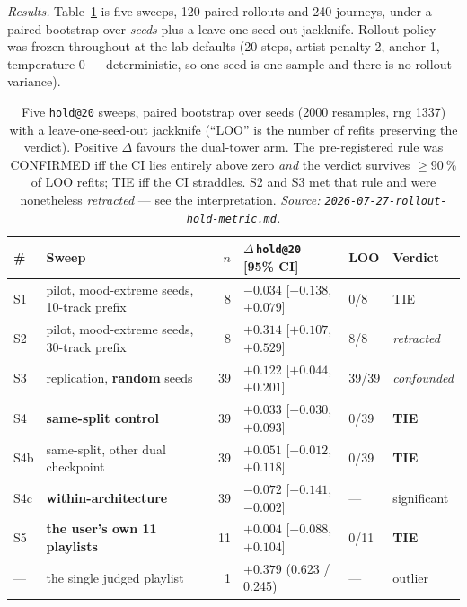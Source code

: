 \documentclass[11pt]{article}
\newcommand{\best}[1]{\textbf{#1}}
\begin{document}
\emph{Results.} Table~\ref{tab:rollout} is five sweeps, \num{120} paired
rollouts and \num{240} journeys, under a paired bootstrap over \emph{seeds} plus a
leave-one-seed-out jackknife. Rollout policy was frozen throughout at the lab
defaults (\num{20} steps, artist penalty \num{2}, anchor \num{1}, temperature
\num{0} --- deterministic, so one seed is one sample and there is no rollout
variance).

\begin{table}[ht]
  \centering
  \caption{Five \texttt{hold@20} sweeps, paired bootstrap over seeds (\num{2000}
  resamples, rng \num{1337}) with a leave-one-seed-out jackknife (``LOO'' is the
  number of refits preserving the verdict). Positive $\Delta$ favours the
  dual-tower arm. The pre-registered rule was CONFIRMED iff the CI lies entirely
  above zero \emph{and} the verdict survives $\ge\SI{90}{\percent}$ of LOO refits;
  TIE iff the CI straddles. S2 and S3 met that rule and were nonetheless
  \emph{retracted} --- see the interpretation.
  \emph{Source: \texttt{2026-07-27-rollout-hold-metric.md}.}}
  \label{tab:rollout}
  {\footnotesize\setlength{\tabcolsep}{4pt}\begin{tabular}{llrlll}
    \toprule
    \# & Sweep & $n$ & $\Delta$\,\texttt{hold@20} [95\% CI] & LOO & Verdict \\
    \midrule
    S1 & pilot, mood-extreme seeds, 10-track prefix & 8 & $-0.034$ [$-0.138$, $+0.079$] & 0/8 & TIE \\
    S2 & pilot, mood-extreme seeds, 30-track prefix & 8 & $+0.314$ [$+0.107$, $+0.529$] & 8/8 & \emph{retracted} \\
    S3 & replication, \textbf{random} seeds & 39 & $+0.122$ [$+0.044$, $+0.201$] & 39/39 & \emph{confounded} \\
    S4 & \textbf{same-split control} & 39 & $+0.033$ [$-0.030$, $+0.093$] & 0/39 & \best{TIE} \\
    S4b & same-split, other dual checkpoint & 39 & $+0.051$ [$-0.012$, $+0.118$] & 0/39 & \best{TIE} \\
    S4c & \textbf{within-architecture} & 39 & $-0.072$ [$-0.141$, $-0.002$] & --- & significant \\
    S5 & \textbf{the user's own \num{11} playlists} & 11 & $+0.004$ [$-0.088$, $+0.104$] & 0/11 & \best{TIE} \\
    --- & the single judged playlist & 1 & $+0.379$ (\num{0.623} / \num{0.245}) & --- & outlier \\
    \bottomrule
  \end{tabular}}
\end{table}
\end{document}
